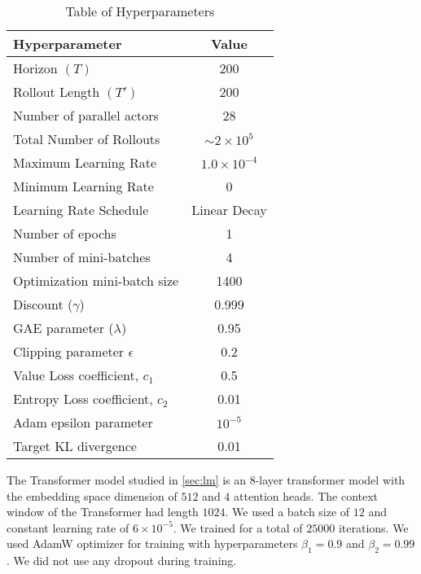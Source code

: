 \begin{table}[ht]
	\centering
	\begin{tabular}{lc}
		\hline
		Hyperparameter & Value \\
		\hline
		Horizon $(T)$ & 200 \\
		Rollout Length $(T')$ & 200 \\
		Number of parallel actors & 28 \\
		Total Number of Rollouts & $\sim 2 \times 10^5$ \\
		Maximum Learning Rate & $1.0 \times 10^{-4}$ \\
		Minimum Learning Rate & 0 \\
		Learning Rate Schedule & Linear Decay \\
		Number of epochs & 1 \\
		Number of mini-batches & 4 \\
		Optimization mini-batch size & 1400 \\
		Discount ($\gamma$) & 0.999 \\
		GAE parameter ($\lambda$) & 0.95 \\
		Clipping parameter $\epsilon$ & 0.2 \\
		Value Loss coefficient, $c_1$ & 0.5 \\
		Entropy Loss coefficient, $c_2$ & 0.01 \\
		Adam epsilon parameter & $10^{-5}$ \\
		Target KL divergence & 0.01 \\
		\hline
	\end{tabular}
	\caption{Table of Hyperparameters}
	\label{tab:ppo_hyperparameters}
\end{table}

The Transformer model studied in \autoref{sec:lm} is an 8-layer transformer model with the embedding space dimension of $512$ and $4$ attention heads. The context window of the Transformer had length $1024$. We used a batch size of $12$ and constant learning rate of $6 \times 10^{-5}$. We trained for a total of $25000$ iterations. We used AdamW optimizer for training with hyperparameters $\beta_1 = 0.9$ and $\beta_2 = 0.99$. We did not use any dropout during training.